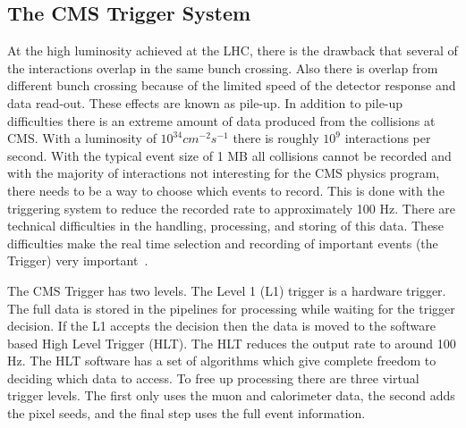 \subsection{The CMS Trigger System}

At the high luminosity achieved at the LHC, there is the drawback that several of the interactions overlap in the same bunch crossing. Also there is overlap from different bunch crossing because of the limited speed of the detector response and data read-out.  These effects are known as pile-up.  In addition to pile-up difficulties there is an extreme amount of data produced from the collisions at CMS. With a luminosity of $10^{34}cm^{-2}s^{-1}$ there is roughly $10^9$ interactions per second.  With the typical event size of 1 MB all collisions cannot be recorded and with the majority of interactions not interesting for the CMS physics program, there needs to be a way to choose which events to record.  This is done with the triggering system to reduce the recorded rate to approximately 100 Hz. There are technical difficulties in the handling, processing, and storing of this data. These difficulties make the real time selection and recording of important events (the Trigger) very important~\cite{Bayatyan:706847}.

The CMS Trigger has two levels.  The Level 1 (L1) trigger is a hardware trigger.  The full data is stored in the pipelines for processing while waiting for the trigger decision.  If the L1 accepts the decision then the data is moved to the software based High Level Trigger (HLT).  The HLT reduces the output rate to around 100 Hz. The HLT software has a set of algorithms which give complete freedom to deciding which data to access.  To free up processing there are three virtual trigger levels.  The first only uses the muon and calorimeter data, the second adds the pixel seeds, and the final step uses the full event information.

